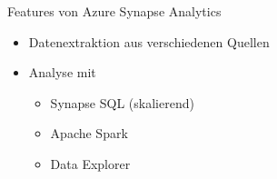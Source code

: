 \begin{flashcard}[Definition]{Features von Azure Synapse Analytics}
  \begin{itemize}
    \item Datenextraktion aus verschiedenen Quellen
    \item Analyse mit
      \begin{itemize}
        \item Synapse SQL (skalierend)
        \item Apache Spark
        \item Data Explorer
      \end{itemize}

  \end{itemize}
\end{flashcard}
